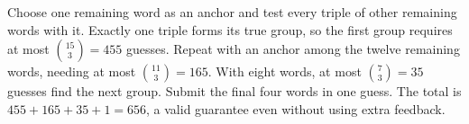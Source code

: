Choose one remaining word as an anchor and test every triple of other remaining words with it. Exactly one triple forms its true group, so the first group requires at most $\binom{15}{3}=455$ guesses. Repeat with an anchor among the twelve remaining words, needing at most $\binom{11}{3}=165$. With eight words, at most $\binom73=35$ guesses find the next group. Submit the final four words in one guess. The total is $455+165+35+1=\boxed{656}$, a valid guarantee even without using extra feedback.
